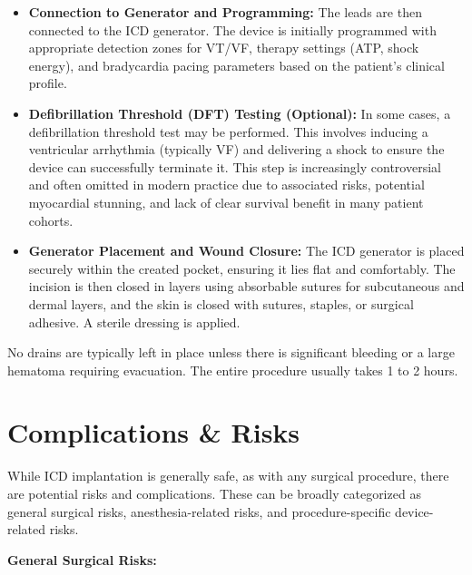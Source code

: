\begin{itemize}
  \item \textbf{Connection to Generator and Programming:} The leads are then connected to the ICD generator. The device is initially programmed with appropriate detection zones for VT/VF, therapy settings (ATP, shock energy), and bradycardia pacing parameters based on the patient's clinical profile.
  
  \item \textbf{Defibrillation Threshold (DFT) Testing (Optional):} In some cases, a defibrillation threshold test may be performed. This involves inducing a ventricular arrhythmia (typically VF) and delivering a shock to ensure the device can successfully terminate it. This step is increasingly controversial and often omitted in modern practice due to associated risks, potential myocardial stunning, and lack of clear survival benefit in many patient cohorts.
  
  \item \textbf{Generator Placement and Wound Closure:} The ICD generator is placed securely within the created pocket, ensuring it lies flat and comfortably. The incision is then closed in layers using absorbable sutures for subcutaneous and dermal layers, and the skin is closed with sutures, staples, or surgical adhesive. A sterile dressing is applied.
\end{itemize}

No drains are typically left in place unless there is significant bleeding or a large hematoma requiring evacuation. The entire procedure usually takes 1 to 2 hours.

\section*{Complications \& Risks}
While ICD implantation is generally safe, as with any surgical procedure, there are potential risks and complications. These can be broadly categorized as general surgical risks, anesthesia-related risks, and procedure-specific device-related risks.

\textbf{General Surgical Risks:}

